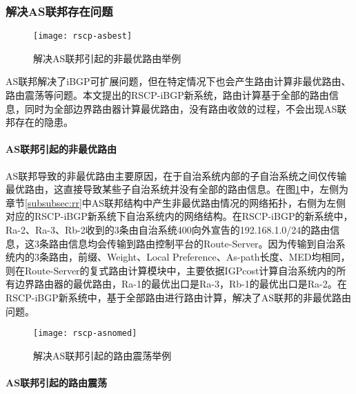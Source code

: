 \subsubsection{解决AS联邦存在问题}


\begin{figure}
  \centering
  \texttt{[image: rscp-asbest]}
  \caption{解决AS联邦引起的非最优路由举例}
  \label{fig:rscp-asbest}
\end{figure}

AS联邦解决了iBGP可扩展问题，但在特定情况下也会产生路由计算非最优路由、路由震荡等问题。本文提出的RSCP-iBGP新系统，路由计算基于全部的路由信息，同时为全部边界路由器计算最优路由，没有路由收敛的过程，不会出现AS联邦存在的隐患。\\

\paragraph{AS联邦引起的非最优路由}
AS联邦导致的非最优路由主要原因，在于自治系统内部的子自治系统之间仅传输最优路由，这直接导致某些子自治系统并没有全部的路由信息。在图\ref{fig:rscp-asbest}中，左侧为章节\ref{subsubsec:rr}中AS联邦结构中产生非最优路由情况的网络拓扑，右侧为左侧对应的RSCP-iBGP新系统下自治系统内的网络结构。在RSCP-iBGP的新系统中，Ra-2、Ra-3、Rb-2收到的3条由自治系统400向外宣告的192.168.1.0/24的路由信息，这3条路由信息均会传输到路由控制平台的Route-Server。因为传输到自治系统内的3条路由，前缀、Weight、Local Preference、As-path长度、MED均相同，则在Route-Server的复式路由计算模块中，主要依据IGPcost计算自治系统内的所有边界路由器的最优路由，Ra-1的最优出口是Ra-3，Rb-1的最优出口是Ra-2。在RSCP-iBGP新系统中，基于全部路由进行路由计算，解决了AS联邦的非最优路由问题。\\




\begin{figure}
  \centering
  \texttt{[image: rscp-asnomed]}
  \caption{解决AS联邦引起的路由震荡举例}
  \label{fig:rscp-asnomed}
\end{figure}

\paragraph{AS联邦引起的路由震荡}

